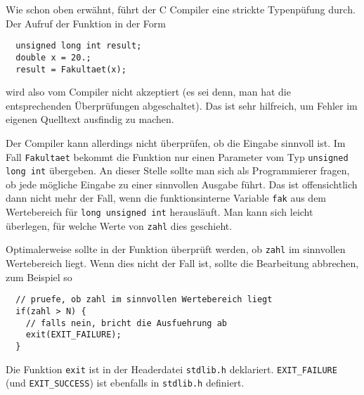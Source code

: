 Wie schon oben erwähnt, führt der C Compiler eine strickte Typenpüfung durch.
Der Aufruf der Funktion in der Form
\begin{lstlisting}
  unsigned long int result;
  double x = 20.;
  result = Fakultaet(x);
\end{lstlisting}
wird also vom Compiler nicht akzeptiert (es sei denn, man hat die entsprechenden Überprüfungen abgeschaltet).
Das ist sehr hilfreich, um Fehler im eigenen Quelltext ausfindig zu machen.

Der Compiler kann allerdings nicht überprüfen, ob die Eingabe sinnvoll ist.
Im Fall \verb|Fakultaet| bekommt die Funktion nur einen Parameter vom Typ \verb|unsigned long int| übergeben. 
An dieser Stelle sollte man sich als Programmierer fragen, ob jede mögliche Eingabe zu einer sinnvollen Ausgabe führt. 
Das ist offensichtlich dann nicht mehr der Fall, wenn die funktionsinterne Variable \verb|fak| aus dem Wertebereich für \verb|long unsigned int| herausläuft. 
Man kann sich leicht überlegen, für welche Werte von \verb|zahl| dies geschieht.

Optimalerweise sollte in der Funktion überprüft werden, ob \verb|zahl| im sinnvollen Wertebereich liegt. 
Wenn dies nicht der Fall ist, sollte die Bearbeitung abbrechen, zum Beispiel so
\begin{lstlisting}
  // pruefe, ob zahl im sinnvollen Wertebereich liegt
  if(zahl > N) {
    // falls nein, bricht die Ausfuehrung ab
    exit(EXIT_FAILURE);
  }
\end{lstlisting}
Die Funktion \verb|exit| ist in der Headerdatei \verb|stdlib.h| deklariert.
\verb|EXIT_FAILURE| (und \verb|EXIT_SUCCESS|) ist ebenfalls in \verb|stdlib.h| definiert.


\endinput
